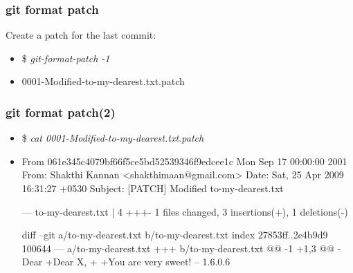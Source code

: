 \documentclass[10pt]{beamer}
\newcommand{\command}[1]{\textsl{\textit{#1}}}
\begin{document}
\begin{frame}[fragile]
\frametitle{git format patch}
Create a patch for the last commit:
\begin{block}{}
\scriptsize
\begin{semiverbatim}
\begin{itemize}[<+-| alert@+>]
\item[]{\$ \command{git-format-patch -1}}
\item[]{0001-Modified-to-my-dearest.txt.patch}
\end{itemize}
\end{semiverbatim}
\end{block}
\end{frame}

%
%

\begin{frame}[fragile]
\frametitle{git format patch(2)}
\begin{block}{}
\scriptsize
\begin{semiverbatim}
\begin{itemize}[<+-| alert@+>]
\item[]{\$ \command{cat 0001-Modified-to-my-dearest.txt.patch}}
\item[]{From 061e345c4079bf66f5ce5bd52539346f9edcee1c Mon Sep 17 00:00:00 2001
From: Shakthi Kannan <shakthimaan@gmail.com>
Date: Sat, 25 Apr 2009 16:31:27 +0530
Subject: [PATCH] Modified to-my-dearest.txt

 ---
 to-my-dearest.txt |    4 +++-
 1 files changed, 3 insertions(+), 1 deletions(-)

diff --git a/to-my-dearest.txt b/to-my-dearest.txt
index 27853ff..2e4b9d9 100644
 --- a/to-my-dearest.txt
 +++ b/to-my-dearest.txt
@@ -1 +1,3 @@
-Dear
+Dear X,
+
+You are very sweet!
 -- 
1.6.0.6}
\end{itemize}
\end{semiverbatim}
\end{block}

\end{frame}

%
%
\end{document}
